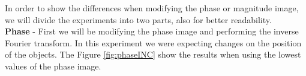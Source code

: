 \documentclass[12pt,a4paper]{article}
\begin{document}
In order to show the differences when modifying the phase or magnitude image, we will divide the experiments into two parts, also for better readability. \\


\textbf{Phase} - First we will be modifying the phase image and performing the inverse Fourier transform. In this experiment we were expecting changes on the position of the objects. The Figure \ref{fig:phaseINC} show the results when using the lowest values of the phase image. \\

\begin{figure}[!h]
	\centering
	\quad
	\\

\end{figure}
\end{document}
